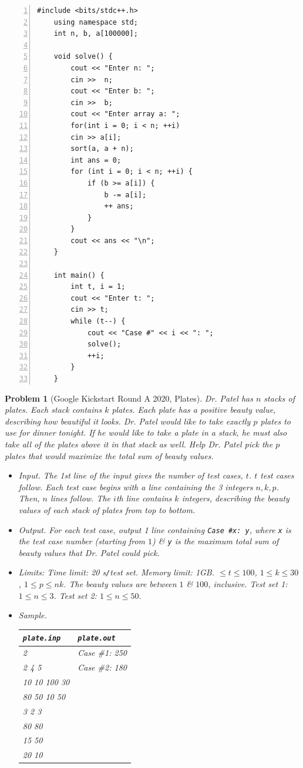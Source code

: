 \documentclass{article}
\newtheorem{problem}{Problem}
\begin{document}
\begin{Verbatim}[numbers=left,xleftmargin=5mm]
	#include <bits/stdc++.h>
	using namespace std;
	int n, b, a[100000];
	
	void solve() {
		cout << "Enter n: ";
		cin >>  n;
		cout << "Enter b: ";
		cin >>  b;
		cout << "Enter array a: ";
		for(int i = 0; i < n; ++i)
		cin >> a[i];
		sort(a, a + n);
		int ans = 0;
		for (int i = 0; i < n; ++i) {
			if (b >= a[i]) {
				b -= a[i];
				++ ans;
			}
		}
		cout << ans << "\n";
	}
	
	int main() {
		int t, i = 1;
		cout << "Enter t: ";
		cin >> t;
		while (t--) {
			cout << "Case #" << i << ": ";
			solve();
			++i;
		}
	}
\end{Verbatim}

\begin{problem}[Google Kickstart Round A 2020, Plates]
	Dr. Patel has $n$ stacks of plates. Each stack contains $k$ plates. Each plate has a positive beauty value, describing how beautiful it looks. Dr. Patel would like to take exactly $p$ plates to use for dinner tonight. If he would like to take a plate in a stack, he must also take all of the plates above it in that stack as well. Help Dr. Patel pick the $p$ plates that would maximize the total sum of beauty values.
	\begin{itemize}
		\item {\sf Input.} The 1st line of the input gives the number of test cases, $t$. $t$ test cases follow. Each test case begins with a line containing the 3 integers $n,k,p$. Then, $n$ lines follow. The $i$th line contains $k$ integers, describing the beauty values of each stack of plates from top to bottom.
		\item {\sf Output.} For each test case, output 1 line containing \verb|Case #x: y|, where {\tt x} is the test case number (starting from $1$) \& {\tt y} is the maximum total sum of beauty values that Dr. Patel could pick.
		\item {\sf Limits:} Time limit: \emph{20 s{\tt/}test set}. Memory limit: \emph{1GB}. $\le t\le100$, $1\le k\le30$, $1\le p\le nk$. The beauty values are between $1$ \& $100$, inclusive. Test set 1: $1\le n\le 3$. Test set 2: $1\le n\le50$.
		\item {\sf Sample.}
		\begin{table}[H]
			\centering
			\begin{tabular}{|l|l|}
				\hline
				{\tt plate.inp} & {\tt plate.out} \\
				\hline
				2 & Case \#1: 250 \\
				2 4 5 & Case \#2: 180 \\
				10 10 100 30 & \\
				80 50 10 50 & \\
				3 2 3 & \\
				80 80 & \\
				15 50 & \\
				20 10 & \\
				\hline
			\end{tabular}
		\end{table}
	\end{itemize}
\end{problem}
\end{document}
